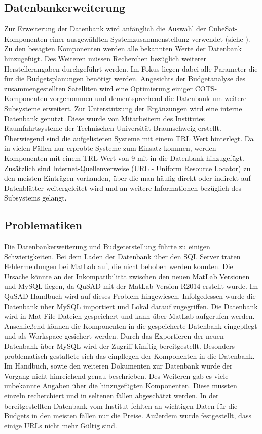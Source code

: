 			\subsection{Datenbankerweiterung}
			Zur Erweiterung der Datenbank wird anfänglich die Auswahl der CubeSat-Komponenten einer ausgewählten Systemzusammenstellung verwendet (siehe ). Zu den besagten Komponenten werden alle bekannten Werte der Datenbank hinzugefügt. Des Weiteren müssen Recherchen bezüglich weiterer Herstellerangaben durchgeführt werden. Im Fokus liegen dabei alle Parameter die für die Budgetsplanungen benötigt werden. Angesichts der Budgetanalyse des zusammengestellten Satelliten wird eine Optimierung einiger COTS-Komponenten vorgenommen und dementsprechend die Datenbank um weitere Subsysteme erweitert. Zur Unterstützung der Ergänzungen wird eine interne Datenbank genutzt. Diese wurde von Mitarbeitern des Institutes Raumfahrtsysteme der Technischen Universität Braunschweig erstellt. Überwiegend sind die aufgelisteten Systeme mit einem TRL Wert hinterlegt. Da in vielen Fällen nur erprobte Systeme zum Einsatz kommen, werden Komponenten mit einem TRL Wert von 9 mit in die Datenbank hinzugefügt. Zusätzlich sind Internet-Quellenverweise (URL - Uniform Resource Locator) zu den meisten Einträgen vorhanden, über die man häufig direkt oder indirekt auf Datenblätter weitergeleitet wird und an weitere Informationen bezüglich des Subsystems gelangt.
			\subsection{Problematiken}
			Die Datenbankerweiterung und Budgeterstellung führte zu einigen Schwierigkeiten. Bei dem Laden der Datenbank über den SQL Server traten Fehlermeldungen bei MatLab auf, die nicht behoben werden konnten. Die Ursache könnte an der Inkompatibilität zwischen den neuen MatLab Versionen und MySQL liegen, da QuSAD mit der MatLab Version R2014 erstellt wurde. Im QuSAD Handbuch wird auf dieses Problem hingewiesen. Infolgedessen wurde die Datenbank über MySQL importiert und Lokal darauf zugegriffen. Die Datenbank wird in Mat-File Dateien gespeichert und kann über MatLab aufgerufen werden. Anschließend können die Komponenten in die gespeicherte Datenbank eingepflegt und als Workspace gesichert werden. Durch das Exportieren der neuen Datenbank über MySQL wird der Zugriff künftig bereitgestellt. Besonders problematisch gestaltete sich das einpflegen der Komponenten in die Datenbank. Im Handbuch, sowie den weiteren Dokumenten zur Datenbank wurde der Vorgang nicht hinreichend genau beschrieben. Des Weiteren gab es viele unbekannte Angaben über die hinzugefügten Komponenten. Diese mussten einzeln recherchiert und in seltenen fällen abgeschätzt werden. In der bereitgestellten Datenbank vom Institut fehlten an wichtigen Daten für die Budgets in den meisten fällen nur die Preise. Außerdem wurde festgestellt, dass einige URLs nicht mehr Gültig sind.
